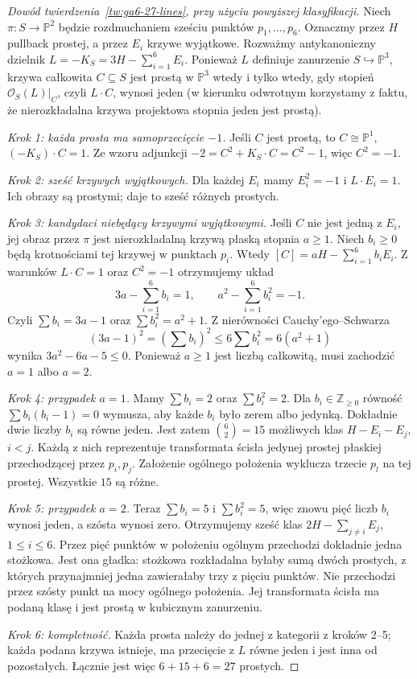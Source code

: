 \documentclass[11pt,a4paper,openany]{report}
\numberwithin{equation}{section}
\theoremstyle{plain}
\theoremstyle{definition}
\theoremstyle{remark}
\newcommand{\Z}{\mathbb Z}
\newcommand{\PP}{\mathbb P}
\begin{document}
\begin{proof}[Dowód twierdzenia~\ref{tw:ga6-27-lines}, przy użyciu powyższej klasyfikacji]
Niech $\pi:S\to\PP^2$ będzie rozdmuchaniem
sześciu punktów $p_1,\ldots,p_6$. Oznaczmy
przez $H$ pullback prostej, a przez $E_i$
krzywe wyjątkowe. Rozważmy antykanoniczny
dzielnik $L=-K_S=3H-\sum_{i=1}^6E_i$.
Ponieważ $L$ definiuje zanurzenie $S\hookrightarrow\PP^3$,
krzywa całkowita $C\subseteq S$ jest prostą
w $\PP^3$ wtedy i tylko wtedy, gdy stopień
$\mathcal O_S(L)|_C$, czyli $L\cdot C$, wynosi jeden
(w kierunku odwrotnym korzystamy z faktu, że
nierozkładalna krzywa projektowa stopnia jeden
jest prostą).

\emph{Krok 1: każda prosta ma samoprzecięcie $-1$.}
Jeśli $C$ jest prostą, to $C\cong\PP^1$,
$(-K_S)\cdot C=1$. Ze wzoru adjunkcji
$-2=C^2+K_S\cdot C=C^2-1$, więc $C^2=-1$.

\emph{Krok 2: sześć krzywych wyjątkowych.}
Dla każdej $E_i$ mamy $E_i^2=-1$ i
$L\cdot E_i=1$. Ich obrazy są prostymi;
daje to sześć różnych prostych.

\emph{Krok 3: kandydaci niebędący krzywymi wyjątkowymi.}
Jeśli $C$ nie jest jedną z $E_i$, jej obraz przez
$\pi$ jest nierozkładalną krzywą płaską stopnia
$a\ge1$. Niech $b_i\ge0$ będą krotnościami
tej krzywej w punktach $p_i$. Wtedy
$[C]=aH-\sum_{i=1}^6b_iE_i$. Z warunków
$L\cdot C=1$ oraz $C^2=-1$ otrzymujemy układ
\[
 3a-\sum_{i=1}^6b_i=1,\qquad
 a^2-\sum_{i=1}^6b_i^2=-1.
\]
Czyli $\sum b_i=3a-1$ oraz
$\sum b_i^2=a^2+1$. Z nierówności Cauchy'ego--Schwarza
\[
 (3a-1)^2=\left(\sum b_i\right)^2
 \le6\sum b_i^2=6(a^2+1)
\]
wynika $3a^2-6a-5\le0$. Ponieważ $a\ge1$
jest liczbą całkowitą, musi zachodzić $a=1$ albo $a=2$.

\emph{Krok 4: przypadek $a=1$.}
Mamy $\sum b_i=2$ oraz $\sum b_i^2=2$.
Dla $b_i\in\Z_{\ge0}$ równość
$\sum b_i(b_i-1)=0$ wymusza, aby każde
$b_i$ było zerem albo jedynką. Dokładnie dwie
liczby $b_i$ są równe jeden. Jest zatem
$\binom{6}{2}=15$ możliwych klas
$H-E_i-E_j$, $i<j$. Każdą z nich reprezentuje
transformata ścisła jedynej prostej płaskiej
przechodzącej przez $p_i,p_j$. Założenie
ogólnego położenia wyklucza trzecie $p_l$
na tej prostej. Wszystkie $15$ są różne.

\emph{Krok 5: przypadek $a=2$.}
Teraz $\sum b_i=5$ i $\sum b_i^2=5$,
więc znowu pięć liczb $b_i$ wynosi jeden,
a szósta wynosi zero. Otrzymujemy sześć klas
$2H-\sum_{j\ne i}E_j$, $1\le i\le6$.
Przez pięć punktów w położeniu ogólnym przechodzi
dokładnie jedna stożkowa. Jest ona gładka:
stożkowa rozkładalna byłaby sumą dwóch prostych,
z których przynajmniej jedna zawierałaby trzy
z pięciu punktów. Nie przechodzi przez szósty
punkt na mocy ogólnego położenia. Jej transformata
ścisła ma podaną klasę i jest prostą w kubicznym
zanurzeniu.

\emph{Krok 6: kompletność.}
Każda prosta należy do jednej z kategorii z
kroków 2--5; każda podana krzywa istnieje,
ma przecięcie z $L$ równe jeden i jest inna
od pozostałych. Łącznie jest więc
$6+15+6=27$ prostych.
\end{proof}
\end{document}
